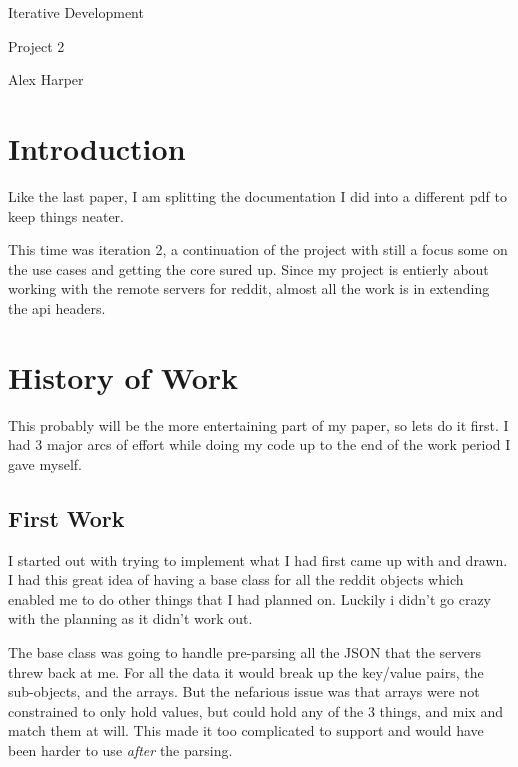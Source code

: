 \documentclass[12pt]{article}
\begin{document}
\begin{titlepage}
	\centering
	{\Huge Iterative Development\par}
	\vspace{0.25in}
	{\Large Project 2\par}
	\vspace{2in}
	{Alex Harper\par}
	\newpage
\end{titlepage}
\tableofcontents
\newpage

\section{Introduction}

Like the last paper, I am splitting the documentation I did into a different pdf to keep things neater.

This time was iteration 2, a continuation of the project with still a focus some on the use cases and getting the core sured up.
Since my project is entierly about working with the remote servers for reddit, almost all the work is in extending the api headers.

\section{History of Work}

This probably will be the more entertaining part of my paper, so lets do it first.
I had 3 major arcs of effort while doing my code up to the end of the work period I gave myself.

\subsection{First Work}

I started out with trying to implement what I had first came up with and drawn.
I had this great idea of having a base class for all the reddit objects which enabled me to do other things that I had planned on.
Luckily i didn't go crazy with the planning as it didn't work out.

The base class was going to handle pre-parsing all the JSON that the servers threw back at me.
For all the data it would break up the key/value pairs, the sub-objects, and the arrays.
But the nefarious issue was that arrays were not constrained to only hold values, but could hold any of the 3 things, and mix and match them at will.
This made it too complicated to support and would have been harder to use \textit{after} the parsing.
\end{document}

